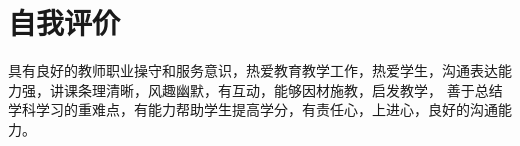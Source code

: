 \documentclass[zihao=-4,a4paper,fontset=none]{ctexart}
\newlength{\iconwidth}
\begin{document}
    \vspace{1.2em}
    \begin{minipage}[t]{\textwidth}
        \section[自我评价]{\makebox[\iconwidth][c]{\color{main}{\faChalkboardTeacher}}\quad 自我评价}
具有良好的教师职业操守和服务意识，热爱教育教学工作，热爱学生，沟通表达能力强，讲课条理清晰，风趣幽默，有互动，能够因材施教，启发教学， 善于总结学科学习的重难点，有能力帮助学生提高学分，有责任心，上进心，良好的沟通能力。
    \end{minipage}


\end{document}
